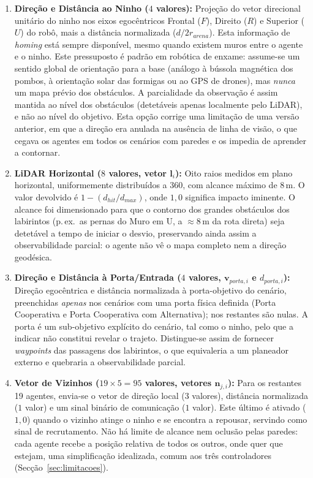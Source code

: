 \documentclass[12pt,reqno, twoside]{amsbook}
\theoremstyle{plain}
\numberwithin{equation}{chapter}
\numberwithin{section}{chapter}
\numberwithin{table}{chapter}
\numberwithin{figure}{chapter}
\begin{document}
\begin{enumerate}
    \item \textbf{Direção e Distância ao Ninho ($4$ valores):} Projeção do vetor direcional unitário do ninho nos eixos egocêntricos Frontal ($F$), Direito ($R$) e Superior ($U$) do robô, mais a distância normalizada ($d / 2r_{arena}$). Esta informação de \emph{homing} está sempre disponível, mesmo quando existem muros entre o agente e o ninho. Este pressuposto é padrão em robótica de enxame: assume-se um sentido global de orientação para a base (análogo à bússola magnética dos pombos, à orientação solar das formigas ou ao GPS de drones), mas \emph{nunca} um mapa prévio dos obstáculos. A parcialidade da observação é assim mantida ao nível dos obstáculos (detetáveis apenas localmente pelo LiDAR), e não ao nível do objetivo. Esta opção corrige uma limitação de uma versão anterior, em que a direção era anulada na ausência de linha de visão, o que cegava os agentes em todos os cenários com paredes e os impedia de aprender a contornar.
    \item \textbf{LiDAR Horizontal ($8$ valores, vetor $\mathbf{l}_i$):} Oito raios medidos em plano horizontal, uniformemente distribuídos a 360\textdegree{}, com alcance máximo de 8\,m. O valor devolvido é $1 - (d_{hit} / d_{max})$, onde $1{,}0$ significa impacto iminente. O alcance foi dimensionado para que o contorno dos grandes obstáculos dos labirintos (p.\,ex.\ as pernas do Muro em U, a $\approx$8\,m da rota direta) seja detetável a tempo de iniciar o desvio, preservando ainda assim a observabilidade parcial: o agente não vê o mapa completo nem a direção geodésica.
    \item \textbf{Direção e Distância à Porta/Entrada ($4$ valores, $\mathbf{v}_{porta, i}$ e $d_{porta, i}$):} Direção egocêntrica e distância normalizada à porta-objetivo do cenário, preenchidas \emph{apenas} nos cenários com uma porta física definida (Porta Cooperativa e Porta Cooperativa com Alternativa); nos restantes são nulas. A porta é um sub-objetivo explícito do cenário, tal como o ninho, pelo que a indicar não constitui revelar o trajeto. Distingue-se assim de fornecer \textit{waypoints} das passagens dos labirintos, o que equivaleria a um planeador externo e quebraria a observabilidade parcial.
    \item \textbf{Vetor de Vizinhos ($19 \times 5 = 95$ valores, vetores $\mathbf{n}_{j, i}$):} Para os restantes 19 agentes, envia-se o vetor de direção local ($3$ valores), distância normalizada ($1$ valor) e um sinal binário de comunicação ($1$ valor). Este último é ativado ($1{,}0$) quando o vizinho atinge o ninho e se encontra a repousar, servindo como sinal de recrutamento. Não há limite de alcance nem oclusão pelas paredes: cada agente recebe a posição relativa de todos os outros, onde quer que estejam, uma simplificação idealizada, comum aos três controladores (Secção~\ref{sec:limitacoes}).
\end{enumerate}
\end{document}
